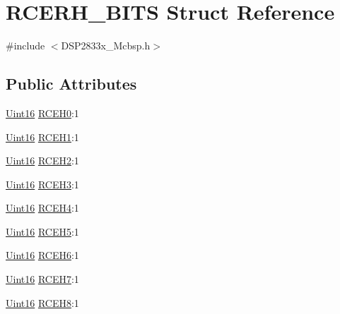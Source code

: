 \hypertarget{struct_r_c_e_r_h___b_i_t_s}{}\section{R\+C\+E\+R\+H\+\_\+\+B\+I\+T\+S Struct Reference}
\label{struct_r_c_e_r_h___b_i_t_s}


{\ttfamily \#include $<$D\+S\+P2833x\+\_\+\+Mcbsp.\+h$>$}

\subsection*{Public Attributes}
\begin{DoxyCompactItemize}
\item 
\hyperlink{_d_s_p2833x___device_8h_a59a9f6be4562c327cbfb4f7e8e18f08b}{Uint16} \hyperlink{struct_r_c_e_r_h___b_i_t_s_a8e7d25667c992f5e033bb24d4617c118}{R\+C\+E\+H0}\+:1
\item 
\hyperlink{_d_s_p2833x___device_8h_a59a9f6be4562c327cbfb4f7e8e18f08b}{Uint16} \hyperlink{struct_r_c_e_r_h___b_i_t_s_a6073c89d88b5a9a7045b9bd0b7ea9f48}{R\+C\+E\+H1}\+:1
\item 
\hyperlink{_d_s_p2833x___device_8h_a59a9f6be4562c327cbfb4f7e8e18f08b}{Uint16} \hyperlink{struct_r_c_e_r_h___b_i_t_s_adf9a61c3eb616d2bd741ae44ab5134e9}{R\+C\+E\+H2}\+:1
\item 
\hyperlink{_d_s_p2833x___device_8h_a59a9f6be4562c327cbfb4f7e8e18f08b}{Uint16} \hyperlink{struct_r_c_e_r_h___b_i_t_s_a9bcb799c9bf389cb9232fab107b20ec5}{R\+C\+E\+H3}\+:1
\item 
\hyperlink{_d_s_p2833x___device_8h_a59a9f6be4562c327cbfb4f7e8e18f08b}{Uint16} \hyperlink{struct_r_c_e_r_h___b_i_t_s_ab8d60b66044b02a55680691672801dfc}{R\+C\+E\+H4}\+:1
\item 
\hyperlink{_d_s_p2833x___device_8h_a59a9f6be4562c327cbfb4f7e8e18f08b}{Uint16} \hyperlink{struct_r_c_e_r_h___b_i_t_s_ac829a17d30312458bd663673ddeb8dba}{R\+C\+E\+H5}\+:1
\item 
\hyperlink{_d_s_p2833x___device_8h_a59a9f6be4562c327cbfb4f7e8e18f08b}{Uint16} \hyperlink{struct_r_c_e_r_h___b_i_t_s_a030be8564cdd0caaa765310e7d4deef3}{R\+C\+E\+H6}\+:1
\item 
\hyperlink{_d_s_p2833x___device_8h_a59a9f6be4562c327cbfb4f7e8e18f08b}{Uint16} \hyperlink{struct_r_c_e_r_h___b_i_t_s_a788e60e5a7c6b8317bfdf977ff8b7e3c}{R\+C\+E\+H7}\+:1
\item 
\hyperlink{_d_s_p2833x___device_8h_a59a9f6be4562c327cbfb4f7e8e18f08b}{Uint16} \hyperlink{struct_r_c_e_r_h___b_i_t_s_a686faf6213e349df3de9ccbb2f3fb60b}{R\+C\+E\+H8}\+:1

\end{DoxyCompactItemize}
